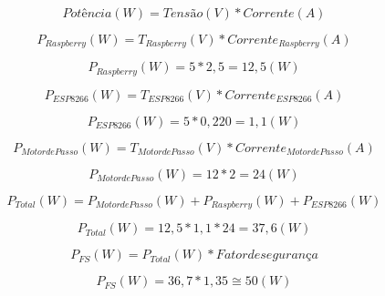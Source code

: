 \begin{equation}
    Potência\left ( W \right ) = Tensão\left ( V \right ) \ast Corrente\left ( A \right )
\end{equation}

\begin{equation}
    P_{Raspberry}\left ( W \right ) = T_{Raspberry}\left ( V \right ) \ast Corrente_{Raspberry}\left ( A \right )
\end{equation}

\begin{equation}
    P_{Raspberry}\left ( W \right ) = 5 \ast 2,5 = 12,5 \left ( W \right )
\end{equation}

\begin{equation}
    P_{ESP8266}\left ( W \right ) = T_{ESP8266}\left (V \right ) \ast Corrente_{ESP8266} \left ( A \right )
\end{equation}

\begin{equation}
    P_{ESP8266}\left ( W \right ) = 5 \ast 0,220 = 1,1 \left ( W \right )
\end{equation}

\begin{equation}
    P_{Motor de Passo}\left ( W \right ) = T_{Motor de Passo}\left (V \right ) \ast Corrente_{Motor de Passo} \left ( A \right )
\end{equation}

\begin{equation}
    P_{Motor de Passo}\left ( W \right ) = 12 \ast 2 = 24 \left ( W \right )
\end{equation}

\begin{equation}
    P_{Total}\left ( W \right ) = P_{Motor de Passo}\left (W \right ) + P_{Raspberry} \left ( W \right ) + P_{ESP8266} \left (W \right )
\end{equation}

\begin{equation}
    P_{Total}\left ( W \right ) = 12,5 * 1,1 * 24 = 37,6 \left ( W \right )
\end{equation}

\begin{equation}
    P_{FS}\left ( W \right ) = P_{Total}\left ( W \right ) * Fator de segurança
\end{equation}

\begin{equation}
    P_{FS}\left ( W \right ) = 36,7 * 1,35 \cong  50\left ( W \right )
\end{equation}

